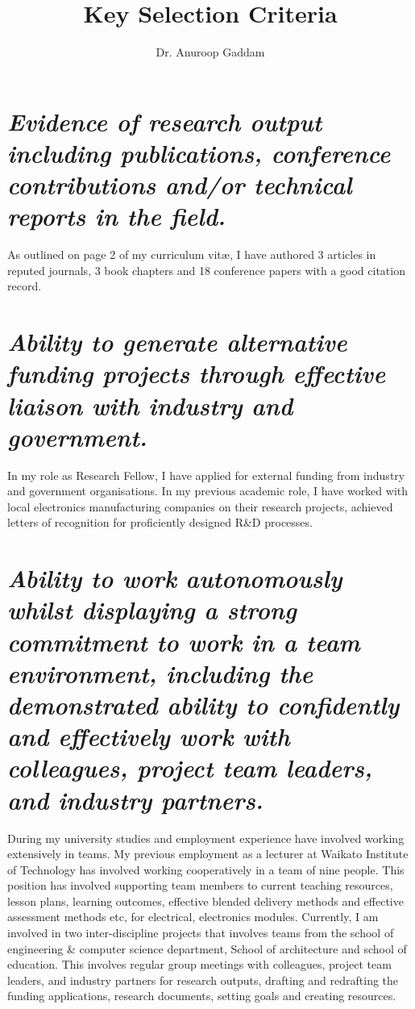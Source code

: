 \documentclass{article}
\title{Key Selection Criteria}
\author{Dr. Anuroop Gaddam}
\begin{document}
\onehalfspacing
\maketitle

\section{\textit{\fontsize{12}{12}\selectfont Evidence of research output including publications, conference contributions and/or technical reports in the field.} }

\fontsize{12}{12}\selectfont As outlined on page 2 of my curriculum vitæ, I have authored 3 articles in reputed journals, 3 book chapters and 18 conference papers with a good citation record. 

\section{\textit{\fontsize{12}{12}\selectfont Ability to generate alternative funding projects through effective liaison with industry and government.}}

\fontsize{12}{12}\selectfont In my role as Research Fellow, I have applied for external funding from industry and government organisations. In my previous academic role, I have worked with local electronics manufacturing companies on their research projects, achieved letters of recognition for proficiently designed R&D processes.

\section{\textit{\fontsize{12}{12}\selectfont Ability to work autonomously whilst displaying a strong commitment to work in a team environment, including the demonstrated ability to confidently and effectively work with colleagues, project team leaders, and industry partners.}}

During my university studies and employment experience have involved working extensively in teams. My previous employment as a lecturer at Waikato Institute of Technology has involved working cooperatively in a team of nine people. This position has involved supporting team members to current teaching resources, lesson plans, learning outcomes, effective blended delivery methods and effective assessment methods etc, for electrical, electronics modules. Currently, I am involved in two inter-discipline projects that involves teams from the school of engineering \& computer science department, School of architecture and school of education. This involves regular group meetings with colleagues, project team leaders, and industry partners for research outputs, drafting and redrafting the funding applications, research documents, setting goals and creating resources. 
\end{document}
